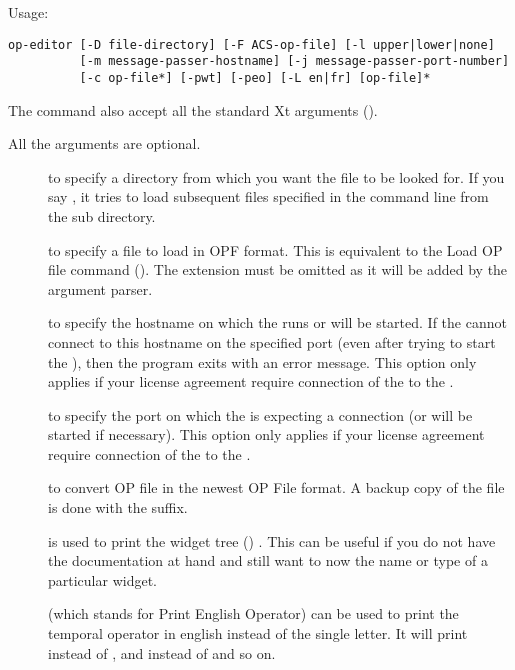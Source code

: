 Usage: \begin{verbatim}
op-editor [-D file-directory] [-F ACS-op-file] [-l upper|lower|none]
          [-m message-passer-hostname] [-j message-passer-port-number]
          [-c op-file*] [-pwt] [-peo] [-L en|fr] [op-file]*
\end{verbatim}

The  command also accept all the standard Xt arguments
(). 

All the arguments are optional.

\begin{description}

\item[] to specify a directory from which you want the file to
be looked for. If you say , it tries to load
subsequent files specified in the command line from the 
sub directory.

\item[] to specify a file to load in OPF format. This is
equivalent to the Load OP file command (). The
 extension must be omitted as it will be added by the
argument parser.

\item[] to specify the hostname on which the \MPA{} runs or will be
started. If the \OPE{} cannot connect to this hostname on the specified port
(even after trying to start the \MPA{}), then the program exits with an error
message. This option only applies if your license agreement require connection
of the \OPE{} to the \MPA{}.

\item[] to specify the port on which the \MPA{} is expecting a
connection (or will be started if necessary). This option only applies if your
license agreement require connection of the \OPE{} to the \MPA{}.

\item[] to convert OP file in the newest OP File format. A backup copy
of the file is done with the  suffix.

\item[] is used to print the \OPE{} widget tree () . This can be useful if you do not have the
documentation at hand and still want to now the name or type of a particular
widget.

\item[] (which stands for Print English Operator) can be used to
print the temporal operator in english instead of the single letter. It will
print  instead of \samp{!}, and  instead of \samp{\^{}}
and so on.


\end{description}
